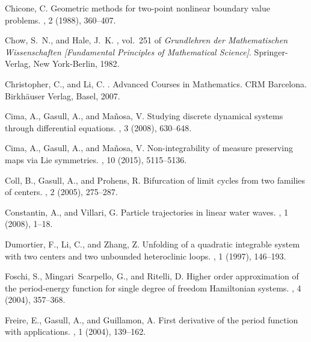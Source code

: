 \documentclass[12pt,a4paper,reqno]{amsart}
\begin{document}
\begin{thebibliography}{10}
{\sc Chicone, C.}
\newblock Geometric methods for two-point nonlinear boundary value problems.
, 2 (1988), 360--407.

{\sc Chow, S.~N., and Hale, J.~K.}
, vol.~251 of {\em Grundlehren der
  Mathematischen Wissenschaften [Fundamental Principles of Mathematical
  Science]}.
\newblock Springer-Verlag, New York-Berlin, 1982.

{\sc Christopher, C., and Li, C.}
.
\newblock Advanced Courses in Mathematics. CRM Barcelona. Birkh\"{a}user
  Verlag, Basel, 2007.

{\sc Cima, A., Gasull, A., and Ma\~{n}osa, V.}
\newblock Studying discrete dynamical systems through differential equations.
, 3 (2008), 630--648.

{\sc Cima, A., Gasull, A., and Ma\~{n}osa, V.}
\newblock Non-integrability of measure preserving maps via {L}ie symmetries.
, 10 (2015), 5115--5136.

{\sc Coll, B., Gasull, A., and Prohens, R.}
\newblock Bifurcation of limit cycles from two families of centers.
, 2
  (2005), 275--287.

{\sc Constantin, A., and Villari, G.}
\newblock Particle trajectories in linear water waves.
, 1 (2008), 1--18.

{\sc Dumortier, F., Li, C., and Zhang, Z.}
\newblock Unfolding of a quadratic integrable system with two centers and two
  unbounded heteroclinic loops.
, 1 (1997), 146--193.

{\sc Foschi, S., Mingari~Scarpello, G., and Ritelli, D.}
\newblock Higher order approximation of the period-energy function for single
  degree of freedom {H}amiltonian systems.
, 4 (2004), 357--368.

{\sc Freire, E., Gasull, A., and Guillamon, A.}
\newblock First derivative of the period function with applications.
, 1 (2004), 139--162.


\end{thebibliography}
\end{document}
